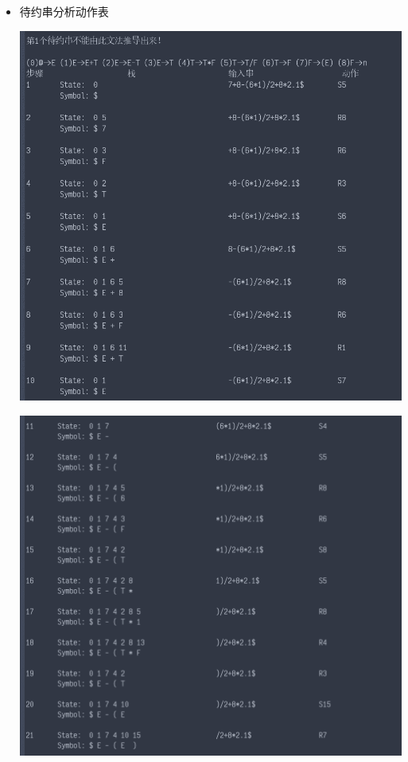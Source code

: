 \documentclass[fontset=none,UTF8,a4paper,zihao=-4]{ctexart}
\begin{document}
\begin{itemize}
\item 待约串分析动作表

\begin{center}
\includegraphics[width=.9\linewidth]{运行截图/2020-11-26_00-48-40_screenshot.png}
\end{center}

\begin{center}
\includegraphics[width=.9\linewidth]{运行截图/2020-11-26_00-49-00_screenshot.png}
\end{center}


\end{itemize}
\end{document}
